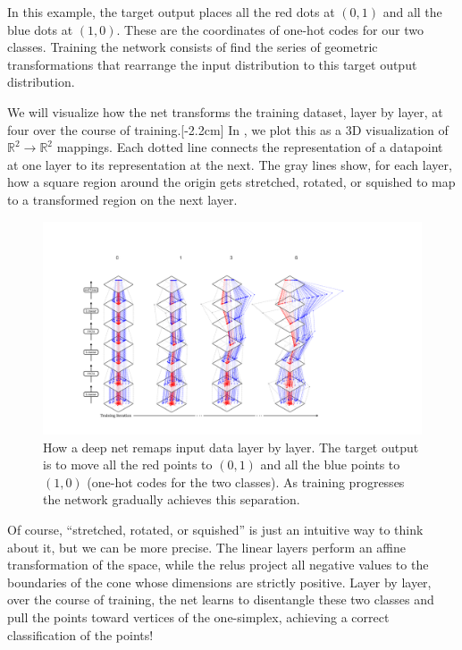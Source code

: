 In this example, the target output places all the red dots at $(0,1)$ and all the blue dots at $(1,0)$. These are the coordinates of one-hot codes for our two classes. Training the network consists of find the series of geometric transformations that rearrange the input distribution to this target output distribution.

We will visualize how the net transforms the training dataset, layer by layer, at four  over the course of training.[-2.2cm] In \fig{\ref{fig:neural_nets:nn_training_viz}}, we plot this as a 3D visualization of $\mathbb{R}^2 \rightarrow \mathbb{R}^2$ mappings. Each dotted line connects the representation of a datapoint at one layer to its representation at the next. The gray lines show, for each layer, how a square region around the origin gets stretched, rotated, or squished to map to a transformed region on the next layer.
\begin{figure}[h]
    \centerline{
    \includegraphics[width=1.0\linewidth]{./figures/neural_nets/nn_training_viz2.pdf}
    }
    \caption{How a deep net remaps input data layer by layer. The target output is to move all the red points to $(0,1)$ and all the blue points to $(1,0)$ (one-hot codes for the two classes). As training progresses the network gradually achieves this separation.}
    \label{fig:neural_nets:nn_training_viz}
\end{figure}

Of course, ``stretched, rotated, or squished'' is just an intuitive way to think about it, but we can be more precise. The linear layers perform an affine transformation of the space, while the relus project all negative values to the boundaries of the cone whose dimensions are strictly positive. Layer by layer, over the course of training, the net learns to disentangle these two classes and pull the points toward vertices of the one-simplex, achieving a correct classification of the points!


